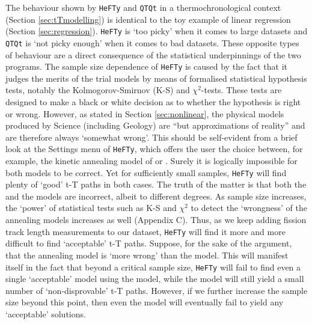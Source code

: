 \documentclass{article}
\begin{document}
The behaviour shown by {\tt HeFTy} and {\tt QTQt} in a
thermochronological context (Section \ref{sec:tTmodelling}) is
identical to the toy example of linear regression (Section
\ref{sec:regression}). {\tt HeFTy} is `too picky' when it comes to
large datasets and {\tt QTQt} is `not picky enough' when it comes to
bad datasets. These opposite types of behaviour are a direct
consequence of the statistical underpinnings of the two programs.  The
sample size dependence of {\tt HeFTy} is caused by the fact that it
judges the merits of the trial models by means of formalised
statistical hypothesis tests, notably the Kolmogorov-Smirnov (K-S) and
$\chi^2$-tests. These tests are designed to make a black or white
decision as to whether the hypothesis is right or wrong.  However, as
stated in Section \ref{sec:nonlinear}, the physical models produced by
Science (including Geology) are ``but approximations of reality'' and
are therefore always `somewhat wrong'.  This should be self-evident
from a brief look at the Settings menu of {\tt HeFTy}, which offers
the user the choice between, for example, the kinetic annealing model
of \cite{laslett1987} or \cite{ketcham2007}. Surely it is logically
impossible for both models to be correct. Yet for sufficiently small
samples, {\tt HeFTy} will find plenty of `good' t-T paths in both
cases. The truth of the matter is that both the \cite{laslett1987}
and the \cite{ketcham2007} models are incorrect, albeit to different
degrees. As sample size increases, the `power' of statistical tests
such as K-S and $\chi^2$ to detect the `wrongness' of the annealing
models increases as well (Appendix C).  Thus, as we keep adding
fission track length measurements to our dataset, {\tt HeFTy} will
find it more and more difficult to find `acceptable' t-T
paths. Suppose, for the sake of the argument, that the
\cite{laslett1987} annealing model is `more wrong' than the
\cite{ketcham2007} model. This will manifest itself in the fact that
beyond a critical sample size, {\tt HeFTy} will fail to find even a
single `acceptable' model using the \cite{laslett1987} model, while
the \cite{ketcham2007} model will still yield a small number of
`non-disprovable' t-T paths. However, if we further increase the
sample size beyond this point, then even the \cite{ketcham2007} model
will eventually fail to yield any `acceptable' solutions.\\
\end{document}
